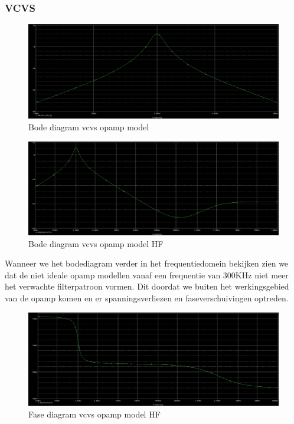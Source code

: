 \documentclass[]{article}
\begin{document}
\newpage

\subsubsection*{VCVS}

\begin{figure}[H]
	\centering
	\includegraphics[width=13cm]{bode_vcvs_smal}
	\caption{Bode diagram vcvs opamp model}
\end{figure}

\begin{figure}[H]
	\centering
	\includegraphics[width=13cm]{bode_vcvs}
	\caption{Bode diagram vcvs opamp model HF}
\end{figure}

Wanneer we het bodediagram verder in het frequentiedomein bekijken zien we dat de niet ideale opamp modellen vanaf een frequentie van 300KHz niet meer het verwachte filterpatroon vormen. Dit doordat we buiten het werkingsgebied van de opamp komen en er spanningsverliezen en faseverschuivingen optreden.

\begin{figure}[H]
	\centering
	\includegraphics[width=13cm]{fase_vcvs}
	\caption{Fase diagram vcvs opamp model HF}
\end{figure}
\end{document}
